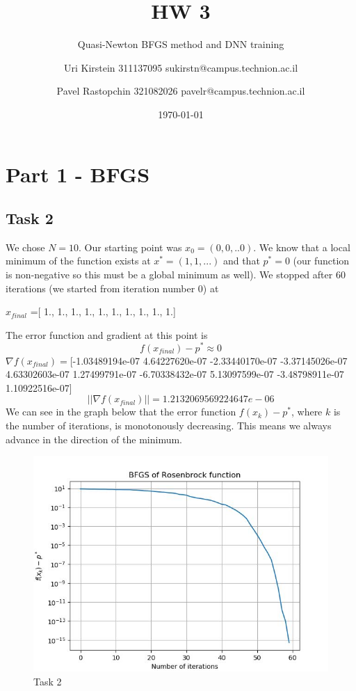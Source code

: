 \documentclass[12pt]{scrartcl}
\begin{document}

\titlehead{CS department, Technion}
\subject{Introduction to Optimization and Deep Learning 236330}
\title{HW 3}
\subtitle{Quasi-Newton BFGS method and DNN training}
\author{Uri Kirstein 311137095 \hfill sukirstn@campus.technion.ac.il\and Pavel Rastopchin 321082026 pavelr@campus.technion.ac.il}
\date{\today}
\maketitle

\section*{Part 1 - BFGS}
\subsection*{Task 2}
We chose $N=10$. Our starting point was $x_0=(0,0,..0)$. We know that a local minimum of the function exists at $x^*=(1,1,...)$ and that $p^*=0$ (our function is non-negative so this must be a global minimum as well). We stopped after 60 iterations (we started from iteration number 0) at
\begin{center}
$x_{final}$ =[ 1.,  1., 1., 1., 1., 1., 1., 1., 1., 1.]
\end{center}
The error function and gradient at this point is $$f(x_{final})-p^*\approx 0$$
$\nabla f(x_{final})=$[-1.03489194e-07 4.64227620e-07 -2.33440170e-07 -3.37145026e-07 \\
4.63302603e-07 1.27499791e-07 -6.70338432e-07 5.13097599e-07 -3.48798911e-07 \\
1.10922516e-07]
$$||\nabla f(x_{final})|| = 1.2132069569224647e-06$$
We can see in the graph below that the error function $f(x_k)-p^*$, where $k$ is the number of iterations, is monotonously decreasing. This means we always advance in the direction of the minimum.
\begin{figure}[ht!]
	\hfill\includegraphics[width=\linewidth]{rosenbrock_graph.jpg}\hspace*{\fill}
	\caption{Task 2}
\end{figure}
\end{document}
